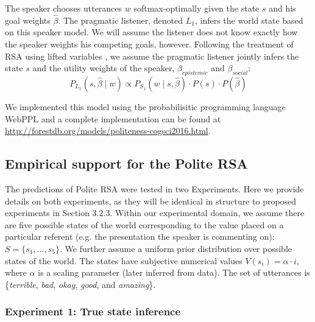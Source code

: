 The speaker chooses utterances $w$ softmax-optimally given the state $s$ and his goal weights $\hat{\beta}$. The pragmatic listener, denoted $L_1$, infers the world state based on this speaker model. We will assume the listener does not know exactly how the speaker weights his competing goals, however.
Following the treatment of RSA using lifted variables \citep{GoodmanLassiter2015, bergen2016, Kao2014},
we assume the pragmatic listener jointly infers the state $s$ and the utility weights of the speaker, $\beta_{epistemic}$ and $\beta_{social}$:
\begin{equation}
P_{L_1}(s,  \hat{\beta} \mid w)\propto P_{S_1}(w \mid s,  \hat{\beta})\cdot P(s) \cdot P( \hat{\beta}) \label{eq:L1}
\end{equation}

We implemented this model using the probabilisitic programming language WebPPL \cite{dippl} and a complete implementation can be found at \url{http://forestdb.org/models/politeness-cogsci2016.html}.


\subsection{Empirical support for the Polite RSA}

The predictions of Polite RSA were tested in two Experiments. Here we provide details on both experiments, as they will be identical in structure to proposed experiments in Section 3.2.3. 
Within our experimental domain, we assume there are five possible states of the world corresponding to the value placed on a particular referent (e.g. the presentation the speaker is commenting on): $S = \{s_{1}, ...,  s_{5}\}$.
We further assume a uniform prior distribution over possible states of the world.
The states have subjective numerical values $V(s_{i}) = \alpha \cdot i$, where $\alpha$ is a scaling parameter (later inferred from data).
The set of utterances is \{\emph{terrible}, \emph{bad}, \emph{okay}, \emph{good}, and \emph{amazing}\}.

\subsubsection{Experiment 1: True state inference}

